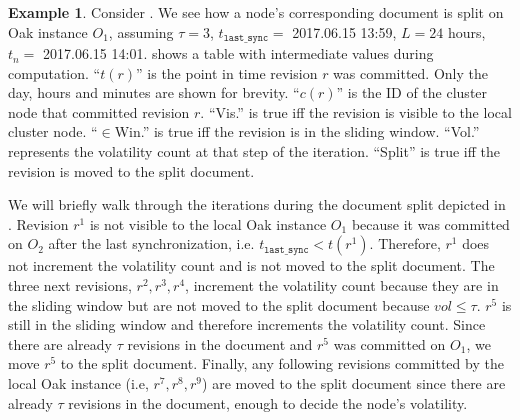 \documentclass[abstracton,12pt]{scrartcl}
\theoremstyle{definition}
\newtheorem{example}{Example}
\begin{document}
\begin{example}
    \label{ex:split_doc}
    Consider .
    We see how a node's corresponding document is split on Oak instance $O_1$, assuming $\tau = 3$, $t_{\texttt{last\_sync}} = $ {\footnotesize 2017.06.15 13:59}, $L = 24$ hours, $t_n = $ {\footnotesize 2017.06.15 14:01}.
     shows a table with intermediate values during computation.
    ``$t(r)$'' is the point in time revision $r$ was committed. Only the day, hours and minutes are shown for brevity.
    ``$c(r)$'' is the ID of the cluster node that committed revision $r$.
    ``Vis.'' is true iff the revision is visible to the local cluster node.
    ``$\in$Win.'' is true iff the revision is in the sliding window.
    ``Vol.'' represents the volatility count at that step of the iteration. 
    ``Split'' is true iff the revision is moved to the split document.

    We will briefly walk through the iterations during the document split depicted in .
    Revision $r^1$ is not visible to the local Oak instance $O_1$ because it was committed on $O_2$ after the last synchronization, i.e. $t_{\texttt{last\_sync}} < t(r^1)$.
    Therefore, $r^1$ does not increment the volatility count and is not moved to the split document.
    The three next revisions, $r^2,r^3,r^4$, increment the volatility count because they are in the sliding window but are not moved to the split document because $vol \leq \tau$.
    $r^5$ is still in the sliding window and therefore increments the volatility count.
    Since there are already $\tau$ revisions in the document and $r^5$ was committed on $O_1$, we move $r^5$ to the split document.
    Finally, any following revisions committed by the local Oak instance (i.e, $r^7, r^8, r^9$) are moved to the split document since there are already $\tau$ revisions in the document, enough to decide the node's volatility.
\end{example}
\end{document}
